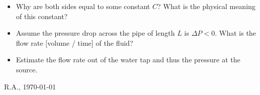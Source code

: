 \documentclass[12pt,a4paper]{article}
\begin{document}
    \begin{itemize}
    \item  
        Why are both sides equal to some constant $C$?
        What is the physical meaning of this constant?
    \item
        Assume the pressure drop across the pipe 
        of length $L$ is $\Delta P < 0$.
        What is the flow rate [volume / time]
        of the fluid?
    \item
        Estimate the flow rate out of the water tap
        and 
        thus the pressure at the source.
    \end{itemize}


    
    
    
    


    \vfill\hfill 
    {\small\textcopyright} R.A., \today
\end{document}
